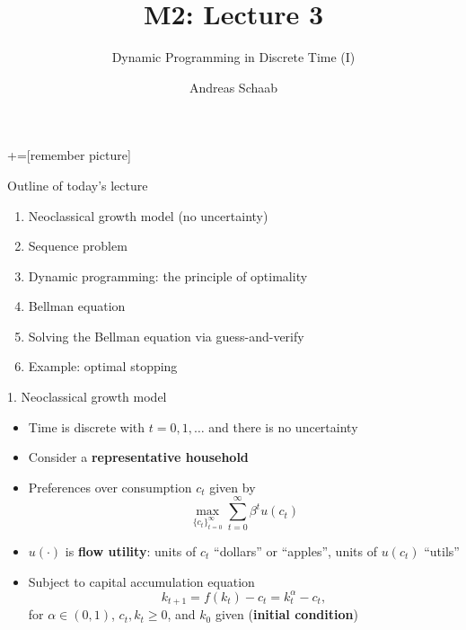 \documentclass[10pt]{beamer}
\title{\large M2: Lecture 3}
\subtitle{Dynamic Programming in Discrete Time (I)}
\author{Andreas Schaab}
\date{}
\begin{document}
+=[remember picture]
\thispagestyle{empty}
\maketitle 
\newpage

\addtocounter{framenumber}{-1}




\begin{frame}{Outline of today's lecture}
\addtocounter{framenumber}{-1}

\begin{enumerate}
\item Neoclassical growth model (no uncertainty)
\item Sequence problem
\item Dynamic programming: the principle of optimality 
\item Bellman equation
\item Solving the Bellman equation via guess-and-verify
\item Example: optimal stopping
\end{enumerate}
\end{frame}



\begin{frame}{1. Neoclassical growth model}
\begin{itemize}
\item Time is discrete with $t = 0, 1, \ldots$ and there is no uncertainty

\item Consider a \textbf{representative household} 

\item Preferences over consumption $c_t$ given by
\begin{equation*}
	\max_{ \{ c_t \}_{t=0}^\infty } \sum_{t = 0}^\infty \beta^t u(c_t)
\end{equation*}

\item $u(\cdot)$ is \textbf{flow utility}: units of $c_t$ ``dollars'' or ``apples'', units of $u(c_t)$ ``utils''

\item Subject to capital accumulation equation 
\begin{equation*}
	k_{t+1} = f(k_t) - c_t = k_t^\alpha - c_t,
\end{equation*}
for $\alpha \in (0, 1)$, $c_t, k_t \geq 0$, and $k_0$ given (\textbf{initial condition})
\end{itemize}
\end{frame}
\end{document}
